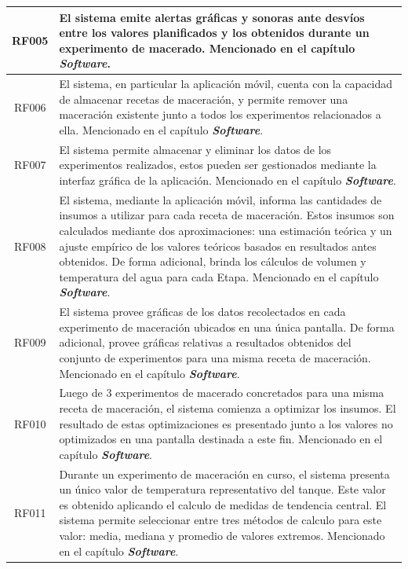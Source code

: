 \begin{longtable}{|p{3cm}|p{11cm}|}
        \multicolumn{1}{|c|}{RF005} & El sistema emite alertas gráficas y sonoras ante desvíos entre los valores planificados y los obtenidos durante un experimento de macerado. Mencionado en el capítulo \textit{\textbf{Software}}. \\
        \hline
        \multicolumn{1}{|c|}{RF006}  & El sistema, en particular la aplicación móvil, cuenta con la capacidad de almacenar recetas de maceración, y permite remover una maceración existente junto a todos los experimentos relacionados a ella. Mencionado en el capítulo \textit{\textbf{Software}}. \\
        \hline
        \multicolumn{1}{|c|}{RF007} & El sistema permite almacenar y eliminar los datos de los experimentos realizados, estos pueden ser gestionados mediante la interfaz gráfica de la aplicación. Mencionado en el capítulo \textit{\textbf{Software}}. \\
        \hline
        \multicolumn{1}{|c|}{RF008} & El sistema, mediante la aplicación móvil, informa las cantidades de insumos a utilizar para cada receta de maceración. Estos insumos son calculados mediante dos aproximaciones: una estimación teórica y un ajuste empírico de los valores teóricos basados en resultados antes obtenidos. De forma adicional, brinda los cálculos de volumen y temperatura del agua para cada Etapa. Mencionado en el capítulo \textit{\textbf{Software}}. \\
        \hline %
        \multicolumn{1}{|c|}{RF009} & El sistema provee gráficas de los datos recolectados en cada experimento de maceración ubicados en una única pantalla. De forma adicional, provee gráficas relativas a resultados obtenidos del conjunto de experimentos para una misma receta de maceración. Mencionado en el capítulo \textit{\textbf{Software}}. \\
        \hline
        \multicolumn{1}{|c|}{RF010} & Luego de 3 experimentos de macerado concretados para una misma receta de maceración, el sistema comienza a optimizar los insumos. El resultado de estas optimizaciones es presentado junto a los valores no optimizados en una pantalla destinada a este fin. Mencionado en el capítulo \textit{\textbf{Software}}. \\
        \hline
        \multicolumn{1}{|c|}{RF011} & Durante un experimento de maceración en curso, el sistema presenta un único valor de temperatura representativo del tanque. Este valor es obtenido aplicando el calculo de medidas de tendencia central. El sistema permite seleccionar entre tres métodos de calculo para este valor: media,  mediana  y  promedio  de  valores extremos. Mencionado en el capítulo \textit{\textbf{Software}}. \\

\end{longtable}
